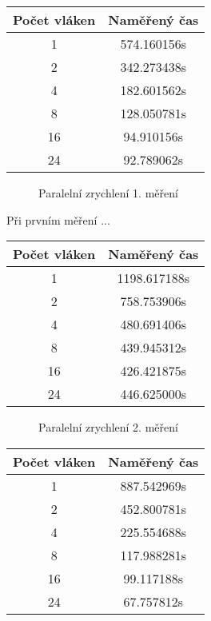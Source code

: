 \documentclass[12pt]{article}
\begin{document}
\begin{center}
\begin{tabular}{ c | c }
\textbf{Počet vláken} & \textbf{Naměřený čas} \\ \hline \hline 
1 & 574.160156s \\ \hline
2 & 342.273438s \\ \hline
4 & 182.601562s \\ \hline
8 & 128.050781s \\ \hline
16 & 94.910156s \\ \hline
24 & 92.789062s \\ \hline
\end{tabular}
\end{center}

\begin{figure}[h]
  \begin{center}
    \caption{Paralelní zrychlení 1. měření} 
  \end{center}
\end{figure}

Při prvním měření ...



\begin{center}
\begin{tabular}{ c | c }
\textbf{Počet vláken} & \textbf{Naměřený čas} \\ \hline \hline 
1 & 1198.617188s \\ \hline
2 & 758.753906s \\ \hline
4 & 480.691406s \\ \hline
8 & 439.945312s \\ \hline
16 & 426.421875s \\ \hline
24 & 446.625000s \\ \hline
\end{tabular}
\end{center}

\begin{figure}[h]
  \begin{center}
    \caption{Paralelní zrychlení 2. měření} 
  \end{center}
\end{figure}




\begin{center}
\begin{tabular}{ c | c }
\textbf{Počet vláken} & \textbf{Naměřený čas} \\ \hline \hline 
1 & 887.542969s \\ \hline
2 & 452.800781s \\ \hline
4 & 225.554688s \\ \hline
8 & 117.988281s \\ \hline
16 & 99.117188s \\ \hline
24 & 67.757812s \\ \hline
\end{tabular}
\end{center}
\end{document}
